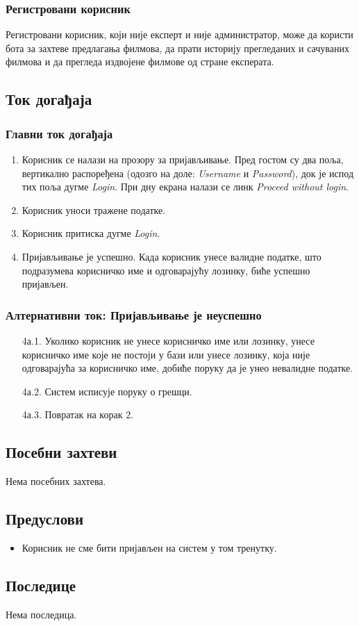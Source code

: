 \documentclass[12pt,a4paper]{article}
\begin{document}
\subsubsection{Регистровани корисник}
Регистровани корисник, који није експерт и није администратор,
може да користи бота за захтеве предлагања филмова, да прати историју прегледаних и сачуваних филмова и
да прегледа издвојене филмове од стране експерата.
\subsection{Ток догађаја}

   \subsubsection{Главни ток догађаја} 
 \begin{enumerate}
        \item {Корисник се налази на прозору за пријављивање.}\newline
          Пред гостом су два поља, вертикално распоређена (одозго на доле: \textit{Username} и \textit{Password}), док је испод тих поља дугме \textit{Login}. При дну екрана налази се линк \textit{Proceed without login}.
      
        \item {Корисник уноси тражене податке.}
        \item {Корисник притиска дугме \textit{Login}.}
        \item {Пријављивање је успешно.}\newline
            Када корисник унесе валидне податке, што подразумева корисничко име и одговарајућу лозинку, биће успешно пријављен.
   
\end{enumerate}
\subsubsection {Алтернативни ток: Пријављивање је неуспешно }
 \begin{enumerate}
    \item[4а.1.]  Уколико корисник не унесе корисничко име или лозинку, унесе корисничко име које не постоји у бази или унесе лозинку, која није одговарајућа за корисничко име, добиће поруку да је унео невалидне податке.
    \item[4а.2.] Систем исписује поруку о грешци.
    \item[4а.3.] Повратак на корак 2.
    \end{enumerate}
\subsection{Посебни захтеви}
Нема посебних захтева.
\subsection{Предуслови}
 \begin{itemize}
     \item Корисник не сме бити пријављен на систем у том тренутку.
 \end{itemize}
 
 
\subsection{Последице}
Нема последица.
\end{document}
